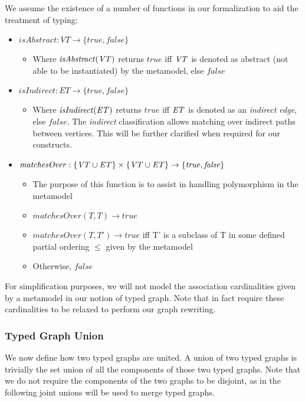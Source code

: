 We assume the existence of a number of functions in our formalization to aid the treatment of typing:

\begin{itemize}
\item $\mathit{isAbstract}: \mathit{VT} \rightarrow \{\mathit{true}, \mathit{false}\}$
\begin{itemize}
\item Where $\mathit{isAbstract}(\mathit{VT})$ returns $\mathit{true}$ iff $\mathit{VT}$ is denoted as abstract (not able to be instantiated) by the metamodel, else $\mathit{false}$
\end{itemize}

\item $\mathit{isIndirect}: \mathit{ET} \rightarrow \{\mathit{true}, \mathit{false}\}$
\begin{itemize}
\item Where $\mathit{isIndirect}(\mathit{ET})$ returns $\mathit{true}$ iff $\mathit{ET}$ is denoted as an \textit{indirect edge}, else $\mathit{false}$. The \textit{indirect} classification allows matching over indirect paths between vertices. This will be further clarified when required for our constructs.
\end{itemize}

\item $\mathit{matchesOver}: \{\mathit{VT} \cup \mathit{ET}\} \times \{\mathit{VT} \cup \mathit{ET}\} \rightarrow \{\mathit{true}, \mathit{false}\}$

\begin{itemize}
\item The purpose of this function is to assist in handling polymorphism in the metamodel
\item $\mathit{matchesOver}(T, T) \rightarrow \mathit{true}$
\item $\mathit{matchesOver}(T, T') \rightarrow \mathit{true}$ iff T' is a subclass of T in some defined partial ordering $\leq$ given by the metamodel
\item Otherwise, $\mathit{false}$
\end{itemize}
\end{itemize}

For simplification purposes, we will not model the association cardinalities given by a metamodel in our notion of typed graph. Note that in fact require these cardinalities to be relaxed to perform our graph rewriting.

\subsubsection*{Typed Graph Union}
We now define how two typed graphs are united. A union of two typed graphs is trivially the set union of all the components of those two typed graphs. Note that we do not require the components of the two graphs to be disjoint, as in the following joint unions will be used to merge typed graphs.

